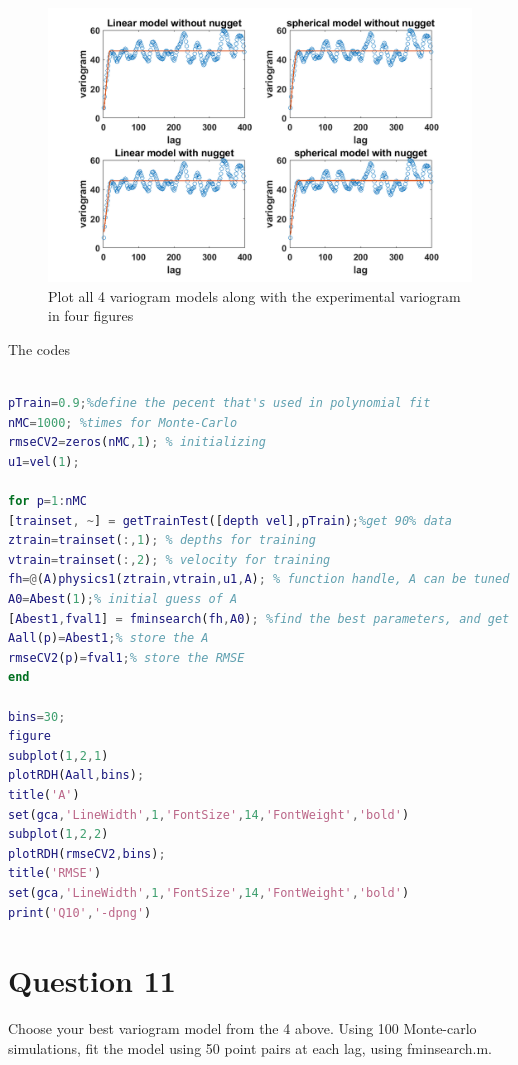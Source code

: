 \documentclass[
	12pt, %
]{fphw}
\begin{document}
 \begin{figure}[htbp]
 	\centering
 	\includegraphics[width=0.68\columnwidth]{Q10_2.png} 
 	\caption{Plot all 4 variogram models along with the experimental variogram in four figures }
 \end{figure}
 
The codes
 
  \begin{lstlisting}[language=Matlab,escapeinside=``]

pTrain=0.9;%define the pecent that's used in polynomial fit
nMC=1000; %times for Monte-Carlo
rmseCV2=zeros(nMC,1); % initializing
u1=vel(1);

for p=1:nMC
[trainset, ~] = getTrainTest([depth vel],pTrain);%get 90% data
ztrain=trainset(:,1); % depths for training
vtrain=trainset(:,2); % velocity for training
fh=@(A)physics1(ztrain,vtrain,u1,A); % function handle, A can be tuned to data in v,z
A0=Abest(1);% initial guess of A
[Abest1,fval1] = fminsearch(fh,A0); %find the best parameters, and get the error
Aall(p)=Abest1;% store the A
rmseCV2(p)=fval1;% store the RMSE
end

bins=30;
figure
subplot(1,2,1)
plotRDH(Aall,bins);
title('A')
set(gca,'LineWidth',1,'FontSize',14,'FontWeight','bold')
subplot(1,2,2)
plotRDH(rmseCV2,bins);
title('RMSE')
set(gca,'LineWidth',1,'FontSize',14,'FontWeight','bold')
print('Q10','-dpng')

 \end{lstlisting}
 
 
 

\clearpage
 \section*{Question 11 }

\begin{problem}

Choose your best variogram model from the 4 above. Using 100 Monte-carlo simulations, fit the model using 50 point pairs at each lag, using fminsearch.m.
	
\end{problem}
\end{document}
